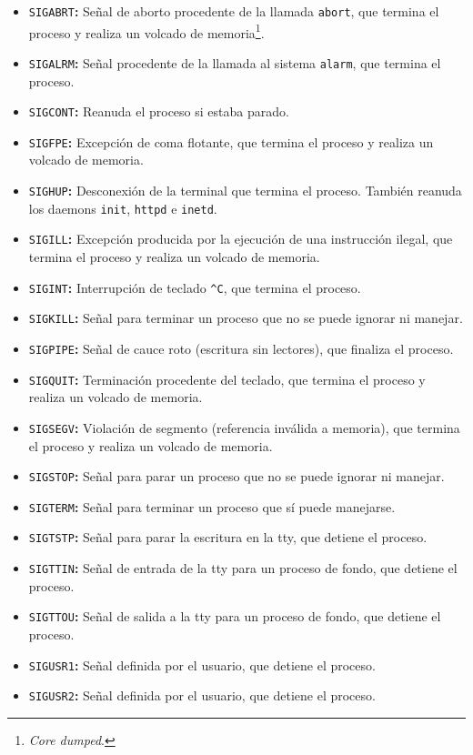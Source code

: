 \begin{itemize}
\item\texttt{SIGABRT}\textbf{:} Señal de aborto procedente de la llamada \texttt{abort}, que termina el proceso y realiza un volcado de memoria\footnote{\emph{Core dumped}.}.
\item\texttt{SIGALRM}\textbf{:} Señal procedente de la llamada al sistema \texttt{alarm}, que termina el proceso.
\item\texttt{SIGCONT}\textbf{:} Reanuda el proceso si estaba parado.
\item\texttt{SIGFPE}\textbf{:} Excepción de coma flotante, que termina el proceso y realiza un volcado de memoria.
\item\texttt{SIGHUP}\textbf{:} Desconexión de la terminal que termina el proceso. También reanuda los daemons \texttt{init}, \texttt{httpd} e \texttt{inetd}.
\item\texttt{SIGILL}\textbf{:} Excepción producida por la ejecución de una instrucción ilegal, que termina el proceso y realiza un volcado de memoria.
\item\texttt{SIGINT}\textbf{:} Interrupción de teclado \texttt{\^{}C}, que termina el proceso.
\item\texttt{SIGKILL}\textbf{:} Señal para terminar un proceso que no se puede ignorar ni manejar.
\item\texttt{SIGPIPE}\textbf{:} Señal de cauce roto (escritura sin lectores), que finaliza el proceso.
\item\texttt{SIGQUIT}\textbf{:} Terminación procedente del teclado, que termina el proceso y realiza un volcado de memoria.
\item\texttt{SIGSEGV}\textbf{:} Violación de segmento (referencia inválida a memoria), que termina el proceso y realiza un volcado de memoria.
\item\texttt{SIGSTOP}\textbf{:} Señal para parar un proceso que no se puede ignorar ni manejar.
\item\texttt{SIGTERM}\textbf{:} Señal para terminar un proceso que sí puede manejarse.
\item\texttt{SIGTSTP}\textbf{:} Señal para parar la escritura en la tty, que detiene el proceso.
\item\texttt{SIGTTIN}\textbf{:} Señal de entrada de la tty para un proceso de fondo, que detiene el proceso.
\item\texttt{SIGTTOU}\textbf{:} Señal de salida a la tty para un proceso de fondo, que detiene el proceso.
\item\texttt{SIGUSR1}\textbf{:} Señal definida por el usuario, que detiene el proceso.
\item\texttt{SIGUSR2}\textbf{:} Señal definida por el usuario, que detiene el proceso.
\end{itemize}


